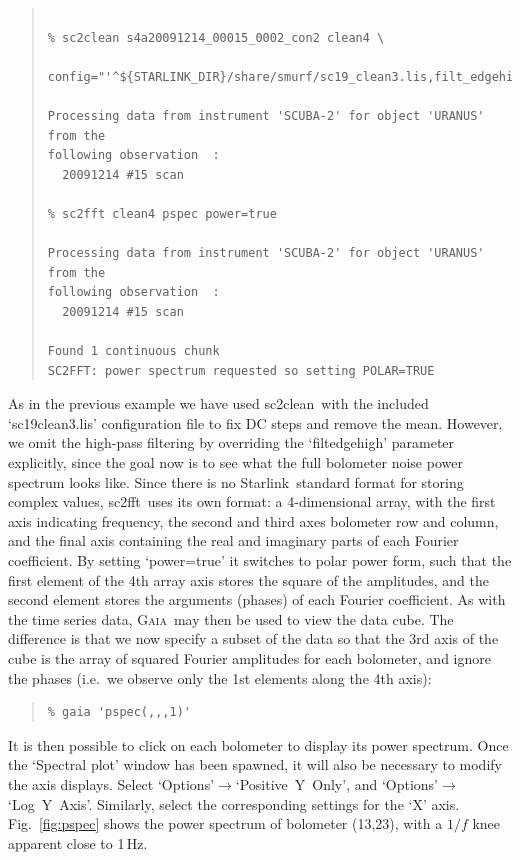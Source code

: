 \documentclass[twoside,11pt]{article}
\newcommand{\htmladdnormallink}[2]{#1}
\newcommand{\xref}[3]{#1}
\renewcommand{\_}{\texttt{\symbol{95}}}
\newenvironment{myquote}{\begin{quote}\begin{small}}{\end{small}\end{quote}}
\newcommand{\starlink}{\htmladdnormallink{Starlink}{http://starlink.jach.hawaii.edu}}
\newcommand{\gaia}{\xref{\textsc{Gaia}}{sun214}{}}
\newcommand{\task}[1]{\textsf{#1}}
\newcommand{\fft}{\xref{\task{sc2fft}}{sun258}{SC2FFT}}
\newcommand{\clean}{\xref{\task{sc2clean}}{sun258}{SC2CLEAN}}
\begin{document}
\begin{myquote}
\begin{verbatim}

% sc2clean s4a20091214_00015_0002_con2 clean4 \
   config="'^${STARLINK_DIR}/share/smurf/sc19_clean3.lis,filt_edgehigh=0'"

Processing data from instrument 'SCUBA-2' for object 'URANUS' from the
following observation  :
  20091214 #15 scan

% sc2fft clean4 pspec power=true

Processing data from instrument 'SCUBA-2' for object 'URANUS' from the
following observation  :
  20091214 #15 scan

Found 1 continuous chunk
SC2FFT: power spectrum requested so setting POLAR=TRUE

\end{verbatim}
\end{myquote}

As in the previous example we have used \clean\ with the included
`sc19\_clean3.lis' configuration file to fix DC steps and remove the
mean. However, we omit the high-pass filtering by overriding the
`filt\_edgehigh' parameter explicitly, since the goal now is to see
what the full bolometer noise power spectrum looks like. Since there
is no \starlink\ standard format for storing complex values,
\fft\ uses its own format: a 4-dimensional array, with the first axis
indicating frequency, the second and third axes bolometer row and
column, and the final axis containing the real and imaginary parts of
each Fourier coefficient. By setting `power=true' it switches to polar
power form, such that the first element of the 4th array axis stores
the square of the amplitudes, and the second element stores the
arguments (phases) of each Fourier coefficient. As with the time
series data, \gaia\ may then be used to view the data cube. The
difference is that we now specify a subset of the data so that the 3rd
axis of the cube is the array of squared Fourier amplitudes for each
bolometer, and ignore the phases (i.e.~we observe only the 1st elements
along the 4th axis):

\begin{myquote}
\begin{verbatim}
% gaia 'pspec(,,,1)'
\end{verbatim}
\end{myquote}

It is then possible to click on each bolometer to display its power
spectrum. Once the `Spectral plot' window has been spawned, it will
also be necessary to modify the axis displays. Select
`Options'$\rightarrow$`Positive~Y~Only', and
`Options'$\rightarrow$`Log~Y~Axis'. Similarly, select the
corresponding settings for the `X' axis. Fig.~\ref{fig:pspec} shows
the power spectrum of bolometer (13,23), with a $1/f$ knee apparent
close to 1\,Hz.
\end{document}
